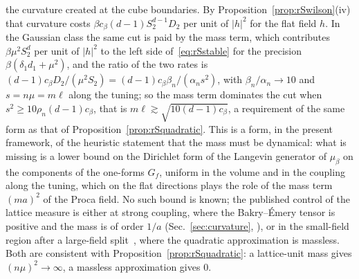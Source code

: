 \begin{remark}
the curvature created at the cube boundaries. By
Proposition~\ref{prop:rSwilson}(iv) that curvature costs $\beta c_\beta(d-1)
S_2^{d-1}D_2$ per unit of $\lvert h\rvert^2$ for the flat field $h$. In the
Gaussian class the same cut is paid by the mass term, which contributes
$\beta\mu^2S_2^d$ per unit of $\lvert h\rvert^2$ to the left side
of~\eqref{eq:rSstable} for the precision $\beta(\delta_1d_1+\mu^2)$, and the
ratio of the two rates is $(d-1)c_\beta D_2/(\mu^2S_2)=(d-1)c_\beta\beta_n/
(\alpha_ns^2)$, with $\beta_n/\alpha_n\to10$ and $s=n\mu=m\ell$ along the
tuning; so the mass term dominates the cut when $s^2\ge10\rho_n(d-1)c_\beta$,
that is $m\ell\gtrsim\sqrt{10(d-1)c_\beta}$, a requirement of the same form
as that of Proposition~\ref{prop:rSquadratic}. This is a form, in the present
framework, of the heuristic statement that the mass must be dynamical: what
is missing is a lower bound on the Dirichlet form of the Langevin generator of
$\mu_\beta$ on the components of the one-forms $G_f$, uniform in the volume
and in the coupling along the tuning, which on the flat directions plays the
role of the mass term $(ma)^2$ of the Proca field. No such bound is known;
the published control of the lattice measure is either at strong coupling,
where the Bakry--\'Emery tensor is positive and the mass is of order $1/a$
(Sec.~\ref{sec:curvature}, \cite{SZZ23}), or in the small-field region after
a large-field split~\cite{Bal89b}, where the quadratic approximation is
massless. Both are consistent with Proposition~\ref{prop:rSquadratic}: a
lattice-unit mass gives $(n\mu)^2\to\infty$, a massless approximation gives
$0$.
\end{remark}
